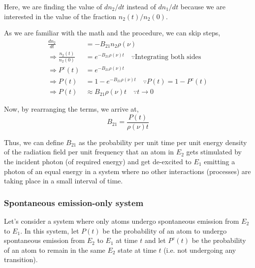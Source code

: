 \documentclass[12pt]{article}
\begin{document}
Here, we are finding the value of $dn_{2}/dt$ instead of $dn_{1}/dt$ because we are interested in the value of the fraction $n_{2}(t)/n_{2}(0)$. \vspace{.2cm}

As we are familiar with the math and the procedure, we can skip steps,
\begin{align*}
    \frac{dn_{2}}{dt} &= -B_{21}n_{2}\rho(\nu) \\
    \Rightarrow \frac{n_2(t)}{n_2(0)} &= e^{-B_{21}\rho(\nu)t} \quad \because \text{Integrating both sides} \\
    \Rightarrow P^c(t) &= e^{-B_{21}\rho(\nu)t} \\
    \Rightarrow P(t) &= 1 - e^{-B_{21}\rho(\nu)t} \quad \because P(t) = 1 - P^c(t) \\
    \Rightarrow P(t) & \approx B_{21}\rho(\nu)t \quad \because t \to 0
\end{align*}

Now, by rearranging the terms, we arrive at,
\begin{equation}
    B_{21} = \frac{P(t)}{\rho(\nu)t}
\end{equation}

Thus, we can define $B_{21}$ as the probability per unit time per unit energy density of the radiation field per unit frequency that an atom in $E_{2}$ gets stimulated by the incident photon (of required energy) and get de-excited to $E_{1}$ emitting a photon of an equal energy in a system where no other interactions (processes) are taking place in a small interval of time.

\subsubsection{Spontaneous emission-only system}

Let's consider a system where only atoms undergo spontaneous emission from $E_{2}$ to $E_{1}$. In this system, let $P(t)$ be the probability of an atom to undergo spontaneous emission from $E_{2}$ to $E_{1}$ at time $t$ and let $P^c(t)$ be the probability of an atom to remain in the same $E_{2}$ state at time $t$ (i.e. not undergoing any transition). \vspace{.2cm}
\end{document}
